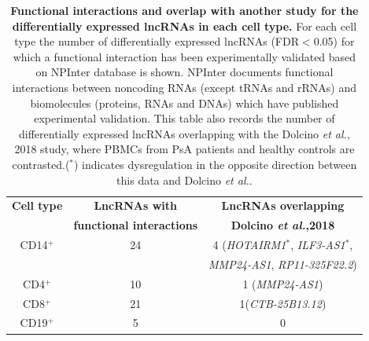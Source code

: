 \begin{table}[htbp]
\centering
\begin{tabular}{@{} c c c}
\toprule
\textbf{Cell type}   & \textbf{LncRNAs with}             &\textbf{LncRNAs overlapping}  \\
                     & \textbf{functional interactions}  &\textbf{Dolcino \textit{et al.},2018}   \\
\midrule
\midrule
CD14$^+$             & 24  & 4 (\textit{HOTAIRM1}$^{\ast}$, \textit{ILF3-AS1}$^{\ast}$, \\
                     &     & \textit{MMP24-AS1}, \textit{RP11-325F22.2})\\                 
CD4$^+$             & 10  & 1 (\textit{MMP24-AS1}) \\
CD8$^+$             & 21  & 1(\textit{CTB-25B13.12})\\
CD19$^+$             & 5   & 0\\
\bottomrule 
\end{tabular}
\medskip %
\caption[Functional interactions and overlap with another study for the differentially expressed lncRNAs in each cell type.]{\textbf{Functional interactions and overlap with another study for the differentially expressed lncRNAs in each cell type.} For each cell type the number of differentially expressed lncRNAs (FDR$<$0.05) for which a functional interaction has been experimentally validated based on NPInter database is shown. NPInter documents functional interactions between noncoding RNAs (except tRNAs and rRNAs) and biomolecules (proteins, RNAs and DNAs) which have published experimental validation. This table also records the number of differentially expressed lncRNAs overlapping with the Dolcino \textit{et al.}, 2018 study, where PBMCs from PsA patients and healthy controls are contrasted.($^{\ast}$) indicates dysregulation in the opposite direction between this data and Dolcino \textit{et al.}.}
\label{tab:RNAseq_PS_CTL_lncRNAs_annotation}
\end{table}
\bigskip %

